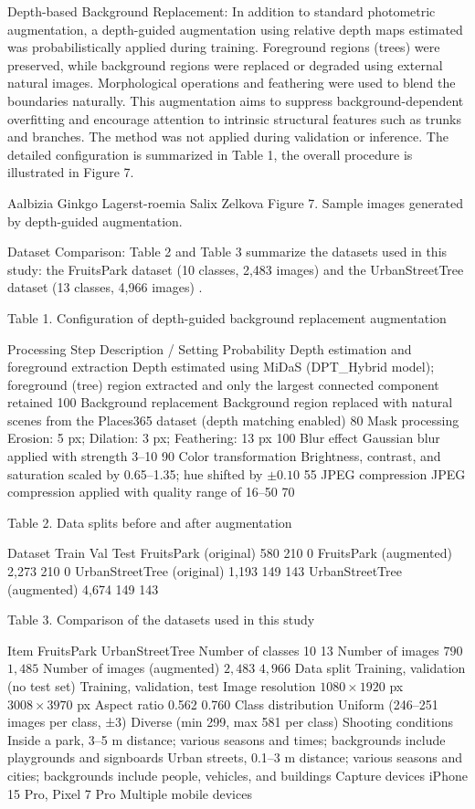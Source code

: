 \documentclass{article}
\begin{document}
Depth-based Background Replacement:
In addition to standard photometric augmentation, a depth-guided augmentation using relative depth maps estimated  was probabilistically applied during training. Foreground regions (trees) were preserved, while background regions were replaced or degraded using external natural images. Morphological operations and feathering were used to blend the boundaries naturally. This augmentation aims to suppress background-dependent overfitting and encourage attention to intrinsic structural features such as trunks and branches. The method was not applied during validation or inference. The detailed configuration is summarized in Table 1, the overall procedure is illustrated in Figure 7.
 
Aalbizia	Ginkgo	Lagerst-roemia	Salix	Zelkova
Figure 7. Sample images generated by depth-guided augmentation.

Dataset Comparison:
Table 2 and Table 3 summarize the datasets used in this study: the FruitsPark dataset (10 classes, 2,483 images) and the UrbanStreetTree dataset (13 classes, 4,966 images) \cite{ref11}. 

Table 1. Configuration of depth-guided background replacement augmentation

Processing Step	Description / Setting	Probability
Depth estimation and foreground extraction	Depth estimated using MiDaS (DPT\_Hybrid model); foreground (tree) region extracted and only the largest connected component retained	100%
Background replacement	Background region replaced with natural scenes from the Places365 dataset (depth matching enabled)	80%
Mask processing	Erosion: 5 px; Dilation: 3 px; Feathering: 13 px	100%
Blur effect	Gaussian blur applied with strength 3–10	90%
Color transformation	Brightness, contrast, and saturation scaled by 0.65–1.35; hue shifted by $\pm 0.10$	55%
JPEG compression	JPEG compression applied with quality range of 16–50	70%

Table 2. Data splits before and after augmentation

Dataset	Train	Val	Test
FruitsPark (original)	580	210	0
FruitsPark (augmented)	2,273	210	0
UrbanStreetTree (original)	1,193	149	143
UrbanStreetTree (augmented)	4,674	149	143
 

Table 3. Comparison of the datasets used in this study

Item	FruitsPark	UrbanStreetTree
Number of classes	10	13
Number of images	$790$	$1,485$
Number of images 
(augmented)	$2,483$	$4,966$
Data split	Training, validation (no test set)	Training, validation, test
Image resolution	$1080 \times 1920$ px	$3008 \times 3970$ px
Aspect ratio	0.562	0.760
Class distribution	Uniform (246–251 images per class, ±3)	Diverse (min 299, max 581 per class)
Shooting conditions	Inside a park, 3–5 m distance; various seasons and times; backgrounds include playgrounds and signboards	Urban streets, 0.1–3 m distance; various seasons and cities; backgrounds include people, vehicles, and buildings
Capture devices	iPhone 15 Pro, Pixel 7 Pro	Multiple mobile devices
\end{document}
